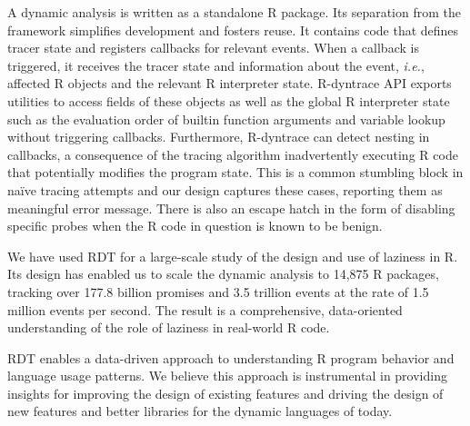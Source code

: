 \documentclass[acmsmall]{acmart}
\newcommand{\Ie}{\emph{i.e.}\xspace}
\newcommand{\RDT}{RDT\xspace}
\newcommand{\RDyntrace}{R-dyntrace\xspace}
\begin{document}
\indent A dynamic analysis is written as a standalone R package. Its separation
from the framework simplifies development and fosters reuse. It contains code
that defines tracer state and registers callbacks for relevant events. When a
callback is triggered, it receives the tracer state and information about the
event, \Ie, affected R objects and the relevant R interpreter state. \RDyntrace
API exports utilities to access fields of these objects as well as the global R
interpreter state such as the evaluation order of builtin function arguments and
variable lookup without triggering callbacks. Furthermore, \RDyntrace can detect
nesting in callbacks, a consequence of the tracing algorithm inadvertently
executing R code that potentially modifies the program state. This is a common
stumbling block in na\"ive tracing attempts and our design captures these cases,
reporting them as meaningful error message. There is also an escape hatch in the
form of disabling specific probes when the R code in question is known to be
benign.

We have used \RDT for a large-scale study of the design and use of laziness in
R. Its design has enabled us to scale the dynamic analysis to 14,875 R packages,
tracking over 177.8 billion promises and 3.5 trillion events at the rate of 1.5
million events per second. The result is a comprehensive, data-oriented
understanding of the role of laziness in real-world R code.

\RDT enables a data-driven approach to understanding R program behavior and
language usage patterns. We believe this approach is instrumental in providing
insights for improving the design of existing features and driving the design of
new features and better libraries for the dynamic languages of today.
\end{document}

